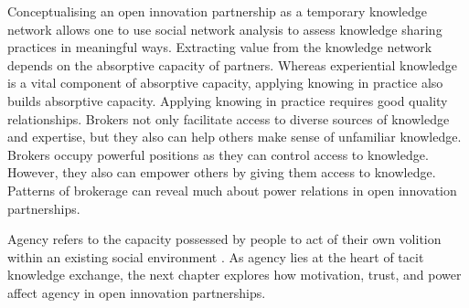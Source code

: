 Conceptualising an open innovation partnership as a temporary knowledge network allows one to use social network analysis to assess knowledge sharing practices in meaningful ways. Extracting value from the knowledge network depends on the absorptive capacity of partners. Whereas experiential knowledge is a vital component of absorptive capacity, applying knowing in practice also builds absorptive capacity. Applying knowing in practice requires good quality relationships. Brokers not only facilitate access to diverse sources of knowledge and expertise, but they also can help others make sense of unfamiliar knowledge. Brokers occupy powerful positions as they can control access to knowledge. However, they also can empower others by giving them access to knowledge. Patterns of brokerage can reveal much about power relations in open innovation partnerships. \medskip

Agency refers to the capacity possessed by people to act of their own volition within an existing social environment   \citep{bandura1989human,emirbayer1998agency}. As agency lies at the heart of tacit knowledge exchange, the next chapter explores how motivation, trust, and power affect agency in open innovation partnerships.